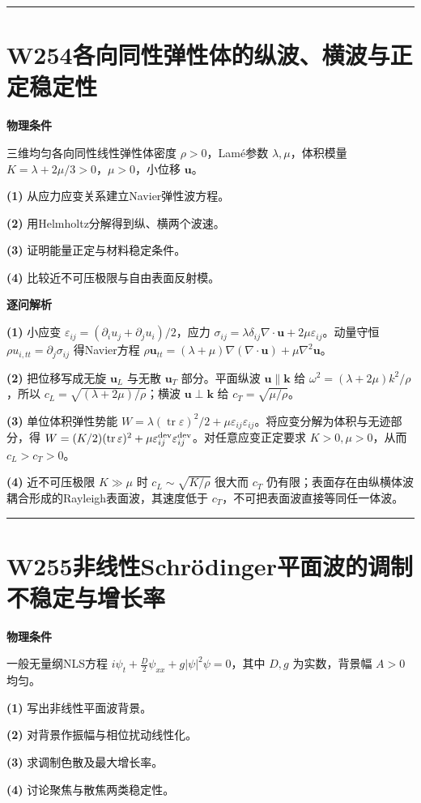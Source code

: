 \documentclass[UTF8,a4paper,11pt,oneside,openany]{ctexbook}
\begin{document}
\par\bigskip\hrule\bigskip
\section*{W254\quad 各向同性弹性体的纵波、横波与正定稳定性}
\textbf{物理条件}\par 三维均匀各向同性线性弹性体密度 \(\rho>0\)，Lamé参数 \(\lambda,\mu\)，体积模量 \(K=\lambda+2\mu/3>0\)，\(\mu>0\)，小位移 \(\boldsymbol u\)。
\par\noindent\textbf{(1)} 从应力应变关系建立Navier弹性波方程。
\par\noindent\textbf{(2)} 用Helmholtz分解得到纵、横两个波速。
\par\noindent\textbf{(3)} 证明能量正定与材料稳定条件。
\par\noindent\textbf{(4)} 比较近不可压极限与自由表面反射模。

\par\medskip\noindent\textbf{逐问解析}
\par\noindent\textbf{(1)} 小应变 \(\varepsilon_{ij}=(\partial_iu_j+\partial_ju_i)/2\)，应力 \(\sigma_{ij}=\lambda\delta_{ij}\nabla\cdot\boldsymbol u+2\mu\varepsilon_{ij}\)。动量守恒 \(\rho u_{i,tt}=\partial_j\sigma_{ij}\) 得Navier方程 \(\rho\boldsymbol u_{tt}=(\lambda+\mu)\nabla(\nabla\cdot\boldsymbol u)+\mu\nabla^2\boldsymbol u\)。
\par\noindent\textbf{(2)} 把位移写成无旋 \(\boldsymbol u_L\) 与无散 \(\boldsymbol u_T\) 部分。平面纵波 \(\boldsymbol u\parallel\boldsymbol k\) 给 \(\omega^2=(\lambda+2\mu)k^2/\rho\)，所以 \(c_L=\sqrt{(\lambda+2\mu)/\rho}\)；横波 \(\boldsymbol u\perp\boldsymbol k\) 给 \(c_T=\sqrt{\mu/\rho}\)。
\par\noindent\textbf{(3)} 单位体积弹性势能 \(W=\lambda(\operatorname{tr}\varepsilon)^2/2+\mu\varepsilon_{ij}\varepsilon_{ij}\)。将应变分解为体积与无迹部分，得 \(W=(K/2)(\operatorname{tr}\varepsilon)^2+\mu\varepsilon_{ij}^{\rm dev}\varepsilon_{ij}^{\rm dev}\)。对任意应变正定要求 \(K>0,\mu>0\)，从而 \(c_L>c_T>0\)。
\par\noindent\textbf{(4)} 近不可压极限 \(K\gg\mu\) 时 \(c_L\sim\sqrt{K/\rho}\) 很大而 \(c_T\) 仍有限；表面存在由纵横体波耦合形成的Rayleigh表面波，其速度低于 \(c_T\)，不可把表面波直接等同任一体波。

\par\bigskip\hrule\bigskip
\section*{W255\quad 非线性Schrödinger平面波的调制不稳定与增长率}
\textbf{物理条件}\par 一般无量纲NLS方程 \(i\psi_t+\tfrac D2\psi_{xx}+g|\psi|^2\psi=0\)，其中 \(D,g\) 为实数，背景幅 \(A>0\) 均匀。
\par\noindent\textbf{(1)} 写出非线性平面波背景。
\par\noindent\textbf{(2)} 对背景作振幅与相位扰动线性化。
\par\noindent\textbf{(3)} 求调制色散及最大增长率。
\par\noindent\textbf{(4)} 讨论聚焦与散焦两类稳定性。
\end{document}
